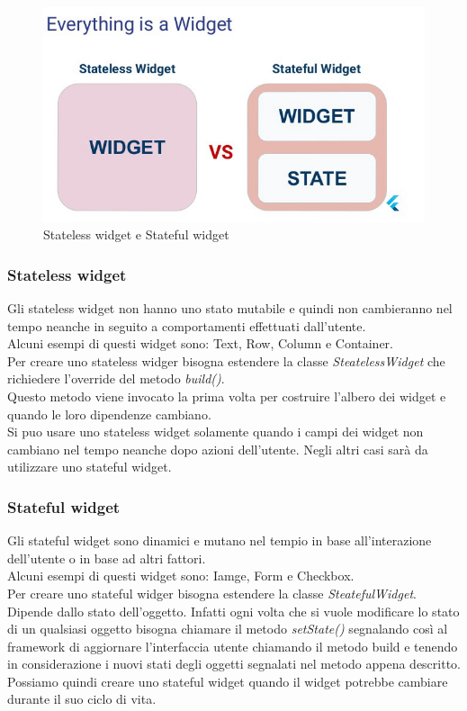 \begin{figure}[htbp]	
	\centering
	\includegraphics[width=13cm]{immagini/state.jpeg}
	\caption{Stateless widget e Stateful widget}
	\label{fig:Stateless widget e Stateful widget}
\end{figure}
\subsubsection{Stateless widget}
Gli stateless widget non hanno uno stato mutabile e quindi non cambieranno nel tempo neanche in seguito a comportamenti effettuati dall'utente.\\
Alcuni esempi di questi widget sono: Text, Row, Column e Container.\\
Per creare uno stateless widger bisogna estendere la classe \textit{SteatelessWidget} che richiedere l'override del metodo \textit{build()}.\\
Questo metodo viene invocato la prima volta per costruire l'albero dei widget e quando le loro dipendenze cambiano.\\
Si puo usare uno stateless widget solamente quando i campi dei widget non cambiano nel tempo neanche dopo azioni dell'utente.
Negli altri casi sarà da utilizzare uno stateful widget.

\subsubsection{Stateful widget}
Gli stateful widget sono dinamici e mutano nel tempio in base all'interazione dell'utente o in base ad altri fattori.\\
Alcuni esempi di questi widget sono: Iamge, Form e Checkbox.\\
Per creare uno stateful widger bisogna estendere la classe \textit{SteatefulWidget}.\\
Dipende dallo stato dell'oggetto. Infatti ogni volta che si vuole modificare lo stato di un qualsiasi oggetto bisogna chiamare il metodo \textit{setState()} segnalando così al framework di aggiornare l'interfaccia utente chiamando il metodo build e tenendo in considerazione i nuovi stati degli oggetti segnalati nel metodo appena descritto. \\
Possiamo quindi creare uno stateful widget quando il widget potrebbe cambiare durante il suo ciclo di vita. 

